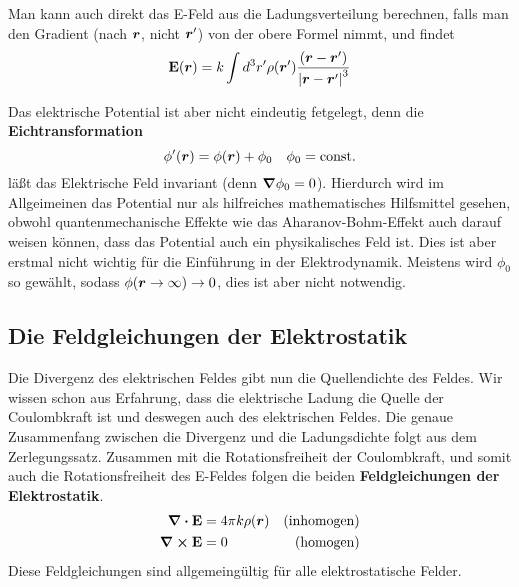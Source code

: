 Man kann auch direkt das E-Feld aus die Ladungsverteilung berechnen, falls 
man den Gradient (nach $\vb*r$, nicht $\vb*r'$) von der obere Formel nimmt, 
und findet
\begin{equation}%
  \label{eq:E-feld}
  \vb E(\vb*r) = k \int d^3r' 
  \rho(\vb*r')\frac{(\vb*r-\vb*r')}{\abs{\vb*r-\vb*r'}^3} 
\end{equation}

Das elektrische Potential ist aber nicht eindeutig fetgelegt, denn die
\textbf{Eichtransformation}
\begin{equation}
  \phi'(\vb*r) = \phi(\vb*r) + \phi_0 \quad \phi_0=\mathrm{const.}
\end{equation}
läßt das Elektrische Feld invariant (denn $\grad\phi_0=0$). Hierdurch wird im
Allgeimeinen das Potential nur als hilfreiches mathematisches Hilfsmittel
gesehen, obwohl quantenmechanische Effekte wie das Aharanov-Bohm-Effekt auch
darauf weisen können, dass das Potential auch ein physikalisches Feld ist. Dies ist aber erstmal nicht wichtig für die Einführung in der Elektrodynamik.
Meistens wird $\phi_0$ so gewählt, sodass $\phi(\vb*r\to\infty)\to0$,
dies ist aber nicht notwendig.

\subsection{Die Feldgleichungen der Elektrostatik}%
\label{ssub:Die-Feldgleichungen}
Die Divergenz des elektrischen Feldes gibt nun die Quellendichte des Feldes.
Wir wissen schon aus Erfahrung, dass die elektrische Ladung die Quelle der 
Coulombkraft ist und deswegen auch des elektrischen Feldes. Die genaue Zusammenfang zwischen die Divergenz und die Ladungsdichte folgt aus dem Zerlegungssatz. Zusammen mit die
Rotationsfreiheit der Coulombkraft, und somit auch die Rotationsfreiheit des
E-Feldes folgen die beiden \textbf{Feldgleichungen der Elektrostatik}.
\begin{equation}
  \begin{aligned}
    \div \vb E &= 4\pi k \rho(\vb*r) & \text{(inhomogen)}\\
    \curl \vb E &= 0 & \text{(homogen)}
  \end{aligned}
\end{equation}
Diese Feldgleichungen sind allgemeingültig für alle elektrostatische Felder.

